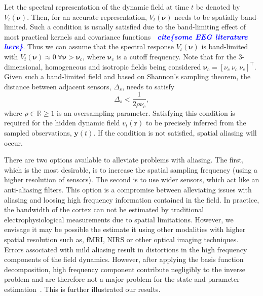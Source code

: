 \documentclass[twocolumn,11pt,a4paper]{article}		%
\newcommand{\todo}[1]{\textsf{\emph{\textbf{\textcolor{blue}{#1}}}}}
\begin{document}
Let the spectral representation of the dynamic field at time $t$ be denoted by $V_t(\boldsymbol{\nu})$. Then, for an accurate representation, $V_t(\boldsymbol{\nu})$ needs to be spatially band-limited. Such a condition is usually satisfied due to the band-limiting effect of most practical kernels and covariance functions \todo{~cite\{some EEG literature here\}}. Thus we can assume that the spectral response $V_t(\boldsymbol{\nu})$ is band-limited with $V_t(\boldsymbol{\nu}) \approx 0 ~ \forall \boldsymbol{\nu} > \boldsymbol{\nu}_c$, where $\boldsymbol{\nu}_c$ is a cutoff frequency. Note that for the 3-dimensional, homogeneous and isotropic fields being considered $\boldsymbol{\nu}_c = [\nu_c ~ \nu_c ~ \nu_c]^\top$. Given such a band-limited field and based on Shannon's sampling theorem, the distance between adjacent sensors, $\Delta_s$, needs to satisfy 
\begin{equation}
	\label{eq:MinimumSensorDistance} \Delta_s < \frac{1}{2\rho\nu_c}, 
\end{equation}
where $\rho \in \mathbb{R} \ge 1$ is an oversampling parameter. Satisfying this condition is required for the hidden dynamic field $v_t(\mathbf{r})$ to be precisely inferred from the sampled observations, $\mathbf{y}(t)$. If the condition is not satisfied, spatial aliasing will occur. 

There are two options available to alleviate problems with aliasing. The first, which is the most desirable, is to increase the spatial sampling frequency (using a higher resolution of sensors). The second is to use wider sensors, which act like an anti-aliasing filters. This option is a compromise between alleviating issues with aliasing and loosing high frequency information contained in the field. In practice, the bandwidth of the cortex can not be estimated by traditional electrophysiological measurements due to spatial limitations. However, we envisage it may be possible the estimate it using other modalities with higher spatial resolution such as, fMRI, NIRS or other optical imaging techniques. Errors associated with mild aliasing result in distortions in the high frequency components of the field dynamics. However, after applying the basis function decomposition, high frequency component contribute negligibly to the inverse problem and are therefore not a major problem for the state and parameter estimation~\cite{Sanner1992}. This is further illustrated our results.
\end{document}

